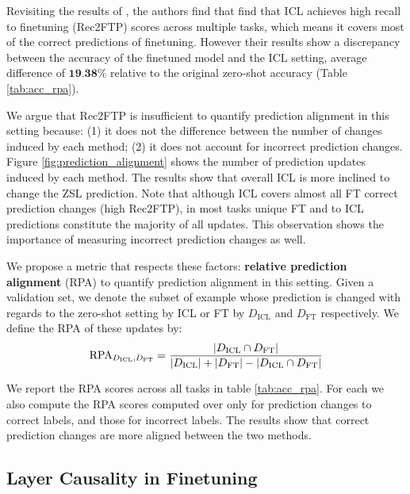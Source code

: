 Revisiting the results of \cite{dai2023gpt}, the authors find that find that ICL achieves high recall to finetuning (Rec2FTP) scores across multiple tasks, which means it covers most of the correct predictions of finetuning. 
However their results show a discrepancy between the accuracy of the finetuned model and the ICL setting, average difference of $\textbf{19.38\%}$ relative to the original zero-shot accuracy (Table \ref{tab:acc_rpa}).


We argue that Rec2FTP is insufficient to quantify prediction alignment in this setting because:
(1) it does not the difference between the number of changes induced by each method;
(2) it does not account for incorrect prediction changes.
Figure \ref{fig:prediction_alignment} shows the number of prediction updates induced by each method.
The results show that overall ICL is more inclined to change the ZSL prediction.
Note that although ICL covers almost all FT correct prediction changes (high Rec2FTP), in most tasks unique FT and to ICL predictions constitute the majority of all updates.
This observation shows the importance of measuring incorrect prediction changes as well.

We propose a metric that respects these factors: \textbf{relative prediction alignment} (RPA) to quantify prediction alignment in this setting.
Given a validation set, we denote the subset of example whose prediction is changed with regards to the zero-shot setting by ICL or FT by $D_\text{ICL}$ and $D_\text{FT}$ respectively.
We define the RPA of these updates by: 
\begin{equation*}
  \text{RPA}_{D_\text{ICL}, D_\text{FT}} = \frac{\left|D_\text{ICL} \cap D_\text{FT}\right|}{\left|D_\text{ICL}\right| + \left|D_\text{FT}\right| - \left|D_\text{ICL} \cap D_\text{FT}\right|} 
\end{equation*}

We report the RPA scores across all tasks in table \ref{tab:acc_rpa}.
For each we also compute the RPA scores computed over only for prediction changes to correct labels, and those for incorrect labels.
The results show that correct prediction changes are more aligned between the two methods.


\subsection{Layer Causality in Finetuning}
\label{sec:layer_causality}



